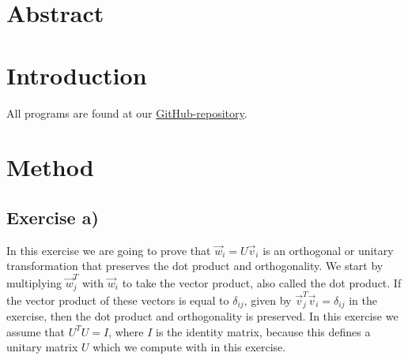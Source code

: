 \documentclass{article}
\begin{document}
\begin{multicols}{2}


\iffalse
\begin{wrapfigure}{l}{0.7\linewidth}
\texttt{[image: ./lion-logo.jpg]}
\caption{This is the former Share\LaTeX{} logo}
\end{wrapfigure}
\fi





\vspace{30cm}

\section{Abstract} \label{sec:Abstract}



\vspace{1cm}

\section{Introduction} \label{sec:Introduction}


All programs are found at our \href{https://github.com/Erikbgram/Fys3150}{GitHub-repository}. \\


\vspace{1cm}

\section{Method} \label{sec:Method}



\subsection{Exercise a)} \label{sec:Method a)}

In this exercise we are going to prove that $\vec{w}_i = U \vec{v}_i$ is an orthogonal or unitary transformation that preserves the dot product and orthogonality. We start by multiplying $\vec{w}_j ^T$ with $\vec{w}_i$ to take the vector product, also called the dot product. If the vector product of these vectors is equal to $\delta_{ij}$, given by $\vec{v}_j ^T \vec{v}_i = \delta_{ij}$ in the exercise, then the dot product and orthogonality is preserved. In this exercise we assume that $U^T U = I$, where $I$ is the identity matrix, because this defines a unitary matrix $U$ which we compute with in this exercise. \\


\end{multicols}
\end{document}
